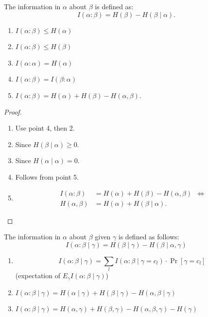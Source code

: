 \begin{definition}
    The information in $\alpha$ about $\beta$ is defined as:
    \[
        I(\alpha : \beta) = H(\beta) - H(\beta \mid \alpha).
    \]
\end{definition}

\begin{lemma}
    \begin{enumerate}
        \item $I(\alpha : \beta) \leq H(\alpha)$
        \item  $I(\alpha : \beta) \leq H(\beta)$
        \item  $I(\alpha : \alpha) = H(\alpha)$
        \item  $I(\alpha : \beta) = I(\beta : \alpha)$
        \item  $I(\alpha : \beta) = H(\alpha) + H(\beta) - H(\alpha, \beta)$.
    \end{enumerate}
\end{lemma}
\begin{proof}
    \begin{enumerate}
        \item Use point 4, then 2.
        \item Since $H(\beta \mid \alpha) \geq 0$.
        \item Since $H(\alpha \mid \alpha) = 0$.
        \item Follows from point 5.
        \item
        \begin{align*}
            I(\alpha : \beta) &= H(\alpha) + H(\beta) - H(\alpha, \beta) &\iff\\
            H(\alpha, \beta) &= H(\alpha) + H(\beta \mid \alpha).
        \end{align*}
    \end{enumerate}
\end{proof}

\begin{definition}
    The information in $\alpha$ about $\beta$ given $\gamma$ is defined as follows:
    \[I(\alpha : \beta \mid \gamma) = H(\beta \mid \gamma) - H(\beta \mid \alpha, \gamma)\]
\end{definition}
\begin{lemma}
    \begin{enumerate}
        \item  \[I(\alpha : \beta \mid \gamma) = \sum_l I(\alpha : \beta \mid \gamma = c_l) \cdot \Pr[\gamma = c_l]\] (expectation of $E_\gamma I(\alpha : \beta \mid \gamma)$)
        \item $I(\alpha : \beta \mid \gamma) = H(\alpha \mid \gamma) + H(\beta \mid \gamma) - H(\alpha, \beta \mid \gamma)$
        \item  $I(\alpha : \beta \mid \gamma) = H(\alpha, \gamma) + H(\beta, \gamma) - H(\alpha, \beta, \gamma) - H(\gamma)$

    \end{enumerate}
\end{lemma}

